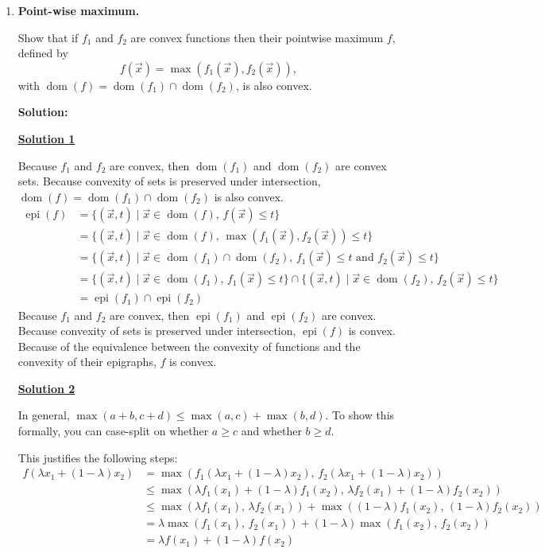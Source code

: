 \documentclass[10pt]{article}
\DeclareMathOperator{\dom}{dom}
\DeclareMathOperator{\epi}{epi}
\begin{document}
\begin{enumerate}[label=(\alph*)]
    \item \textbf{Point-wise maximum.}

    Show that if $f_1$ and $f_2$ are convex functions then their pointwise maximum $f$, defined by
    \begin{equation}
        f(\vec{x}) = \max(f_1(\vec{x}), f_2(\vec{x})),
    \end{equation}
    with $\dom(f) = \dom(f_1) \cap \dom(f_2)$, is also convex.

    \textbf{Solution:}

    \underline{\textbf{Solution 1}}

    Because $f_1$ and $f_2$ are convex, then $\dom(f_1)$ and $\dom(f_2)$ are convex sets. Because convexity of sets is preserved under intersection, $\dom(f) = \dom(f_1) \cap \dom(f_2)$ is also convex.
    \begin{align}
        \epi(f) &= \{(\vec{x}, t) \mid \vec{x} \in \dom(f),\, f(\vec{x}) \leq t\} \\
        &= \{(\vec{x}, t) \mid \vec{x} \in \dom(f),\, \max(f_1(\vec{x}), f_2(\vec{x})) \leq t\} \\
        &= \{(\vec{x}, t) \mid \vec{x} \in \dom(f_1) \cap \dom(f_2),\, f_1(\vec{x}) \leq t \text{ and } f_2(\vec{x}) \leq t\} \\
        &= \{(\vec{x}, t) \mid \vec{x} \in \dom(f_1),\, f_1(\vec{x}) \leq t\} \cap \{(\vec{x}, t) \mid \vec{x} \in \dom(f_2),\, f_2(\vec{x}) \leq t\} \\
        &= \epi(f_1) \cap \epi(f_2)
    \end{align}
    Because $f_1$ and $f_2$ are convex, then $\epi(f_1)$ and $\epi(f_2)$ are convex. Because convexity of sets is preserved under intersection, $\epi(f)$ is convex. Because of the equivalence between the convexity of functions and the convexity of their epigraphs, $f$ is convex.

    \underline{\textbf{Solution 2}}

    In general, $\max(a+b, c+d) \leq \max(a,c) + \max(b,d)$. To show this formally, you can case-split on whether $a \geq c$ and whether $b \geq d$.

    This justifies the following steps:
    \begin{align}
        f(\lambda x_1 + (1-\lambda)x_2) &= \max(f_1(\lambda x_1 + (1-\lambda)x_2),\, f_2(\lambda x_1 + (1-\lambda)x_2)) \\
        &\leq \max(\lambda f_1(x_1) + (1-\lambda)f_1(x_2),\, \lambda f_2(x_1) + (1-\lambda)f_2(x_2)) \\
        &\leq \max(\lambda f_1(x_1),\, \lambda f_2(x_1)) + \max((1-\lambda)f_1(x_2),\, (1-\lambda)f_2(x_2)) \\
        &= \lambda \max(f_1(x_1),\, f_2(x_1)) + (1-\lambda)\max(f_1(x_2),\, f_2(x_2)) \\
        &= \lambda f(x_1) + (1-\lambda) f(x_2)
    \end{align}


\end{enumerate}
\end{document}
